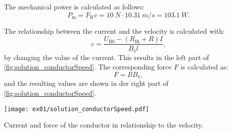 \begin{solutionblock}

    The mechanical power is calculated as follows:
    \begin{equation}
        P_{\mathrm{m}} = F_{\mathrm{R}} v
        = 10 \ \si{N} \cdot 10.31 \ \si{m/s}
        = 103.1 \ \si{W}.
    \end{equation}

    The relationship between the current and the velocity is calculated with:
    \begin{equation}
        v = \frac{U_{\mathrm{B0}}-(R_{\mathrm{Bi}}+R)I}{B_{\updelta} l},
    \end{equation}
    by changing the value of the current. This results in the left part of \autoref{fig:solution_conductorSpeed}.
    The corresponding force $F$ is calculated as:
    \begin{equation}
        F = I l B_{\updelta},
    \end{equation}
    and the resulting values are shown in der right part of \autoref{fig:solution_conductorSpeed}.
    \begin{solutionfigure}[ht]
        \centering
        \texttt{[image: ex01/solution\_conductorSpeed.pdf]}
        \caption{Current and force of the conductor in relationship to the velocity.}
        \label{fig:solution_conductorSpeed}
    \end{solutionfigure}

\end{solutionblock}




